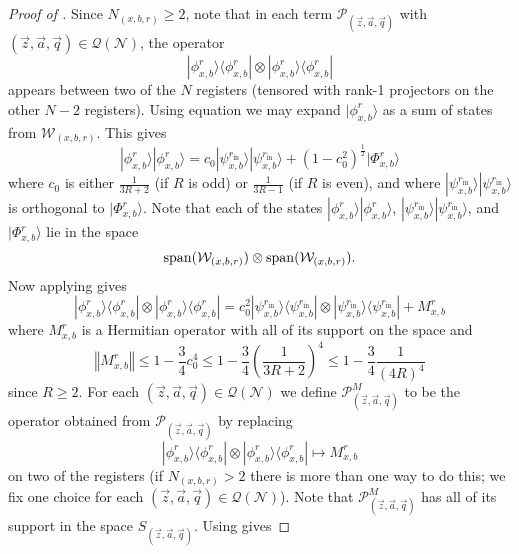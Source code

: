 \documentclass[../thesis-main/thesis-main]{subfiles}
\begin{document}
\begin{proof}[Proof of \protect{}]
Since $N_{(x,b,r)}\geq2$, note that in each term $\mathcal{P}_{(\vec{z},\vec{a},\vec{q})}$ with $(\vec{z},\vec{a},\vec{q})\in\mathcal{Q}(\mathcal{N})$, the operator 
\[
|\phi_{x,b}^{r}\rangle\langle\phi_{x,b}^{r}|\otimes|\phi_{x,b}^{r}\rangle\langle\phi_{x,b}^{r}|
\]
appears between two of the $N$ registers (tensored with rank-1 projectors on the other $N-2$ registers). Using equation  we may expand $|\phi_{x,b}^{r}\rangle$ as a sum of states from $\mathcal{W}_{(x,b,r)}$. This gives
\[
|\phi_{x,b}^{r}\rangle|\phi_{x,b}^{r}\rangle=c_{0}|\psi_{x,b}^{r_{\text{in}}}\rangle|\psi_{x,b}^{r_{\text{in}}}\rangle+\left(1-c_{0}^{2}\right)^{\frac{1}{2}}|\Phi_{x,b}^{r}\rangle
\]
where $c_{0}$ is either $\frac{1}{3R+2}$ (if $R$ is odd) or $\frac{1}{3R-1}$ (if $R$ is even), and where $|\psi_{x,b}^{r_{\text{in}}}\rangle|\psi_{x,b}^{r_{\text{in}}}\rangle$ is orthogonal to $|\Phi_{x,b}^{r}\rangle$. Note that each of the states $|\phi_{x,b}^{r}\rangle|\phi_{x,b}^{r}\rangle$, $|\psi_{x,b}^{r_{\text{in}}}\rangle|\psi_{x,b}^{r_{\text{in}}}\rangle$, and $|\Phi_{x,b}^{r}\rangle$ lie in the space 
\begin{equation}
\operatorname{span}(\mathcal{W}_{(x,b,r)})\otimes\operatorname{span}(\mathcal{W}_{(x,b,r)}).
\label{eq:tensor_prod_WW}
\end{equation}
Now applying  gives
\begin{equation}
|\phi_{x,b}^{r}\rangle\langle\phi_{x,b}^{r}|\otimes|\phi_{x,b}^{r}\rangle\langle\phi_{x,b}^{r}|=c_{0}^{2}|\psi_{x,b}^{r_{\text{in}}}\rangle\langle\psi_{x,b}^{r_{\text{in}}}|\otimes|\psi_{x,b}^{r_{\text{in}}}\rangle\langle\psi_{x,b}^{r_{\text{in}}}|+M_{x,b}^{r}\label{eq:expand_phi_phi_proj}
\end{equation}
where $M_{x,b}^{r}$ is a Hermitian operator with all of its support on the space  and
\begin{equation}
\left\Vert M_{x,b}^{r}\right\Vert \leq1-\frac{3}{4}c_{0}^{4}\leq1-\frac{3}{4}\left(\frac{1}{3R+2}\right)^{4}\leq1-\frac{3}{4}\frac{1}{(4R)^4}
\end{equation}
since $R\geq2$. For each $(\vec{z},\vec{a},\vec{q})\in\mathcal{Q}(\mathcal{N})$ we define $\mathcal{P}_{(\vec{z},\vec{a},\vec{q})}^{M}$ to be the operator obtained from $\mathcal{P}_{(\vec{z},\vec{a},\vec{q})}$ by replacing
\[
|\phi_{x,b}^{r}\rangle\langle\phi_{x,b}^{r}|\otimes|\phi_{x,b}^{r}\rangle\langle\phi_{x,b}^{r}|\mapsto M_{x,b}^{r}
\]
on two of the registers (if $N_{(x,b,r)}>2$ there is more than one way to do this; we fix one choice for each $(\vec{z},\vec{a},\vec{q})\in\mathcal{Q}(\mathcal{N})$). Note that $\mathcal{P}_{(\vec{z},\vec{a},\vec{q})}^{M}$ has all of its support in the space $S_{(\vec{z},\vec{a},\vec{q})}$. Using  gives

\end{proof}
\end{document}
